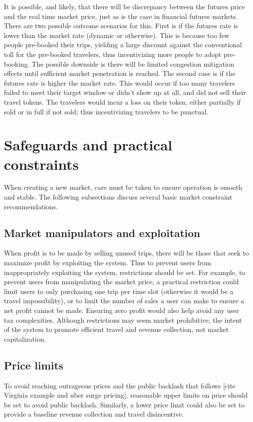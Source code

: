 \documentclass[10pt, letter, twocolumn]{article} %
\begin{document}
It is possible, and likely, that there will be discrepancy between the futures price and the real time market price, just as is the case in financial futures markets. There are two possible outcome scenarios for this. First is if the futures rate is lower than the market rate (dynamic or otherwise). This is because too few people pre-booked their trips, yielding a large discount against the conventional toll for the pre-booked travelers, thus incentivizing more people to adopt pre-booking. The possible downside is there will be limited congestion mitigation effects until sufficient market penetration is reached. The second case is if the futures rate is higher the market rate. This would occur if too many travelers failed to meet their target window or didn't show up at all, and did not sell their travel tokens. The travelers would incur a loss on their token, either partially if sold or in full if not sold; thus incentivizing travelers to be punctual. 

\section{Safeguards and practical constraints}
When creating a new market, care must be taken to ensure operation is smooth and stable. The following subsections discuss several basic market constraint recommendations.

\subsection{Market manipulators and exploitation}
When profit is to be made by selling unused trips, there will be those that seek to maximize profit by exploiting the system.  Thus to prevent users from inappropriately exploiting the system, restrictions should be set. For example, to prevent users from manipulating the market price, a practical restriction could limit users to only purchasing one trip per time slot (otherwise it would be a travel impossibility), or to limit the number of sales a user can make to ensure a net profit cannot be made. Ensuring zero profit would also help avoid any user tax complexities. Although restrictions may seem market prohibitive, the intent of the system to promote efficient travel and revenue collection, not market capitalization. 

\subsection{Price limits}
To avoid reaching outrageous prices and the public backlash that follows [cite Virginia example and uber surge pricing], reasonable upper limits on price should be set to avoid public backlash. Similarly, a lower price limit could also be set to provide a baseline revenue collection and travel disincentive.
\end{document}
